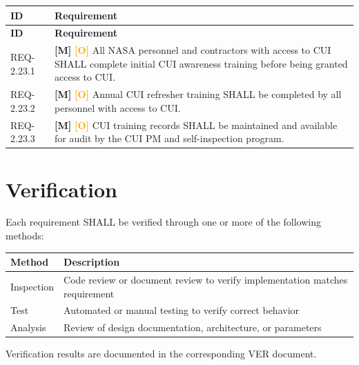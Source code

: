 \documentclass[11pt,letterpaper]{article}
\begin{document}
\begin{longtable}{@{}p{1.4cm}p{11.6cm}@{}}
\toprule
\textbf{ID} & \textbf{Requirement} \\
\midrule
\endfirsthead
\toprule
\textbf{ID} & \textbf{Requirement} \\
\midrule
\endhead

REQ-2.23.1 & \textcolor{mandatory}{\textbf{[M]}} \textcolor{orange}{\textbf{[O]}} All NASA personnel and contractors with access to CUI SHALL complete initial CUI awareness training before being granted access to CUI. \\[6pt]

REQ-2.23.2 & \textcolor{mandatory}{\textbf{[M]}} \textcolor{orange}{\textbf{[O]}} Annual CUI refresher training SHALL be completed by all personnel with access to CUI. \\[6pt]

REQ-2.23.3 & \textcolor{mandatory}{\textbf{[M]}} \textcolor{orange}{\textbf{[O]}} CUI training records SHALL be maintained and available for audit by the CUI PM and self-inspection program. \\[6pt]

\bottomrule
\end{longtable}

\section{Verification}

Each requirement SHALL be verified through one or more of the following methods:

\begin{tabularx}{\textwidth}{lX}
\toprule
\textbf{Method} & \textbf{Description} \\
\midrule
Inspection & Code review or document review to verify implementation matches requirement \\
Test & Automated or manual testing to verify correct behavior \\
Analysis & Review of design documentation, architecture, or parameters \\
\bottomrule
\end{tabularx}

\vspace{12pt}

Verification results are documented in the corresponding VER document.
\end{document}
